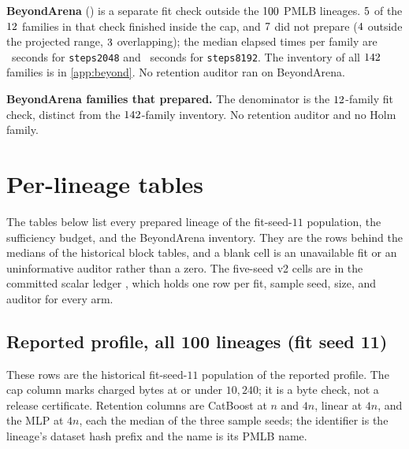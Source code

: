 \documentclass{article}
\begin{document}
\textbf{BeyondArena} (\texttt{\BeyondRevision}) is a separate fit check outside the $100$ PMLB lineages. $5$ of the $\BeyondFamilies$ families in that check finished inside the cap, and $7$ did not prepare ($4$ outside the projected range, $3$ overlapping); the median elapsed times per family are \BeyondElapseA\ seconds for \texttt{steps2048} and \BeyondElapseB\ seconds for \texttt{steps8192}. The inventory of all $\BeyondInventory$ families is in \cref{app:beyond}. No retention auditor ran on BeyondArena.

\begin{table}[t]
\caption{\textbf{BeyondArena families that prepared.} The denominator is the $\BeyondFamilies$-family fit check, distinct from the $\BeyondInventory$-family inventory. No retention auditor and no Holm family.}
\label{tab:beyond}
\centering
\footnotesize
\setlength{\tabcolsep}{3pt}
\resizebox{\linewidth}{!}{\begin{minipage}{7.16in}\end{minipage}}
\end{table}

\section{Per-lineage tables}
The tables below list every prepared lineage of the fit-seed-$11$ population, the sufficiency budget, and the BeyondArena inventory. They are the rows behind the medians of the historical block tables, and a blank cell is an unavailable fit or an uninformative auditor rather than a zero. The five-seed v2 cells are in the committed scalar ledger , which holds one row per fit, sample seed, size, and auditor for every arm.

\subsection{Reported profile, all 100 lineages (fit seed 11)}
\label{app:2048}
These rows are the historical fit-seed-$11$ population of the reported profile. The cap column marks charged bytes at or under $10{,}240$; it is a byte check, not a release certificate. Retention columns are CatBoost at $n$ and $4n$, linear at $4n$, and the MLP at $4n$, each the median of the three sample seeds; the identifier is the lineage's dataset hash prefix and the name is its PMLB name.
\begingroup\scriptsize\setlength{\tabcolsep}{2pt}

\endgroup
\end{document}
